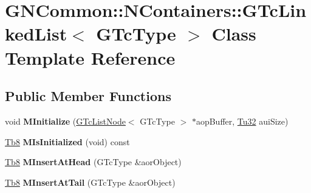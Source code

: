\hypertarget{class_g_n_common_1_1_n_containers_1_1_g_tc_linked_list}{}\section{G\+N\+Common\+:\+:N\+Containers\+:\+:G\+Tc\+Linked\+List$<$ G\+Tc\+Type $>$ Class Template Reference}
\label{class_g_n_common_1_1_n_containers_1_1_g_tc_linked_list}
\subsection*{Public Member Functions}
\begin{DoxyCompactItemize}
\item 
\mbox{\label{class_g_n_common_1_1_n_containers_1_1_g_tc_linked_list_a3a573590845e357e8a8e6f70c3fd79d4}} 
void {\bfseries M\+Initialize} (\mbox{\hyperlink{class_g_n_common_1_1_n_containers_1_1_g_tc_list_node}{G\+Tc\+List\+Node}}$<$ G\+Tc\+Type $>$ $\ast$aop\+Buffer, \mbox{\hyperlink{namespace_g_n_common_a941b527ef318f318aed7903dc832b7e4}{Tu32}} aui\+Size)
\item 
\mbox{\label{class_g_n_common_1_1_n_containers_1_1_g_tc_linked_list_af31039ab1077def5812bc7d61cd53d23}} 
\mbox{\hyperlink{namespace_g_n_common_a8115dc7ed53b6e5b52e6bfde1632ea74}{Tb8}} {\bfseries M\+Is\+Initialized} (void) const
\item 
\mbox{\label{class_g_n_common_1_1_n_containers_1_1_g_tc_linked_list_a8b10f43ce74f55d4e52bcecd39f244bf}} 
\mbox{\hyperlink{namespace_g_n_common_a8115dc7ed53b6e5b52e6bfde1632ea74}{Tb8}} {\bfseries M\+Insert\+At\+Head} (G\+Tc\+Type \&aor\+Object)
\item 
\mbox{\label{class_g_n_common_1_1_n_containers_1_1_g_tc_linked_list_a1119b8779eb4c7398e49f807eaffc23c}} 
\mbox{\hyperlink{namespace_g_n_common_a8115dc7ed53b6e5b52e6bfde1632ea74}{Tb8}} {\bfseries M\+Insert\+At\+Tail} (G\+Tc\+Type \&aor\+Object)
\item 
\mbox{\label{class_g_n_common_1_1_n_containers_1_1_g_tc_linked_list_a0a59862fc85d488e61e04978746f5d3f}} 

\end{DoxyCompactItemize}
